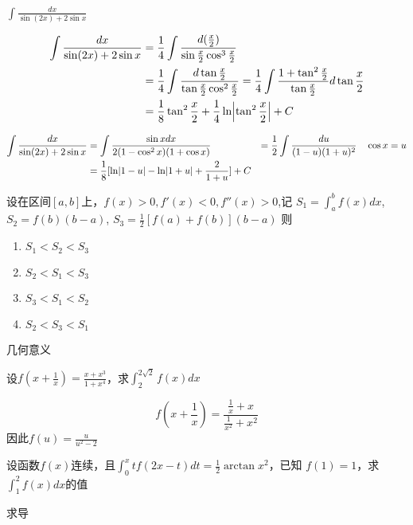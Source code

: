 \documentclass{article}
\begin{document}
\begin{examplle}[]
\(\displaystyle\int\frac{dx}{\sin(2x)+2\sin x}\)

\begin{align*}
\int\frac{dx}{\sin(2x)+2\sin x}&=
\frac{1}{4}\int\frac{d(\frac{x}{2})}{\sin\frac{x}{2}\cos^3\frac{x}{2}}\\
&=\frac{1}{4}\int\frac{d\tan\frac{x}{2}}{\tan\frac{x}{2}\cos^2\frac{x}{2}}=
\frac{1}{4}\int\frac{1+\tan^2\frac{x}{2}}{\tan\frac{x}{2}}d\tan\frac{x}{2}\\
&=\frac{1}{8}\tan^2\frac{x}{2}+\frac{1}{4}\ln\abs{\tan^2\frac{x}{2}}+C
\end{align*}

\begin{align*}
\int\frac{dx}{\sin(2x)+2\sin x}&=\int\frac{\sin xdx}{2(1-\cos^2 x)(1+\cos x)}
&=\frac{1}{2}\int\frac{du}{(1-u)(1+u)^2}\quad \cos x=u\\
&=\frac{1}{8}[\ln\abs{1-u}-\ln\abs{1+u}+\frac{2}{1+u}]+C
\end{align*}
\end{examplle}

\begin{examplle}[]
设在区间\([a,b]\)上，\(f(x)>0,f'(x)<0,f''(x)>0\),记
\(S_1=\int_a^bf(x)dx\),\(S_2=f(b)(b-a)\),
\(S_3=\frac{1}{2}[f(a)+f(b)](b-a)\)
则
\begin{enumerate}
\item \(S_1<S_2<S_3\)
\item \(S_2<S_1<S_3\)
\item \(S_3<S_1<S_2\)
\item \(S_2<S_3<S_1\)
\end{enumerate}


几何意义
\end{examplle}

\begin{examplle}[]
设\(f(x+\frac{1}{x})=\frac{x+x^3}{1+x^4}\)，求\(\int_2^{2\sqrt{2}}f(x)dx\)

\begin{equation*}
f(x+\frac{1}{x})=\frac{\frac{1}{x}+x}{\frac{1}{x^2}+x^2}
\end{equation*}
因此\(f(u)=\frac{u}{u^2-2}\)
\end{examplle}

\begin{examplle}[]
设函数\(f(x)\)连续，且\(\int_0^xtf(2x-t)dt=\frac{1}{2}\arctan x^2\)，已知
\(f(1)=1\)，求\(\int_1^2f(x)dx\)的值

求导
\end{examplle}
\end{document}
